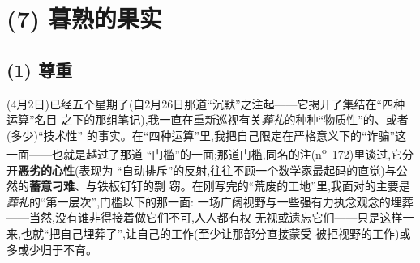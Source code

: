 \section{(7) 暮熟的果实}

\subsection{(1) 尊重}   %


(4月2日)已经五个星期了(自2月26日那道“沉默”之注起——它揭开了集结在“四种运算”名目
之下的那组笔记),我一直在重新巡视有关\emph{葬礼}的种种“物质性”的、或者(多少)“技术性”
的事实。在“四种运算”里,我把自己限定在严格意义下的“诈骗”这一面——也就是越过了那道
“门槛”的一面;那道门槛,同名的注(n\textsuperscript{o}~172)里谈过,它分开\textbf{恶劣的心性}(表现为
“自动排斥”的反射,往往不顾一个数学家最起码的直觉)与公然的\textbf{蓄意刁难}、与铁板钉钉的剽
窃。在刚写完的“荒废的工地”里,我面对的主要是\emph{葬礼}的“第一层次”,门槛以下的那一面:
一场广阔视野\dmark{}与一些强有力执念观念的埋葬——当然,没有谁非得接着做它们不可,人人都有权
无视或遗忘它们——只是这样一来,也就“把自己埋葬了”,让自己的工作(至少让那部分直接蒙受
被拒视野的工作)或多或少归于不育。

